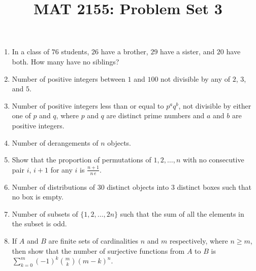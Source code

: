 \documentclass[svgnames]{amsart}
\title{MAT 2155: Problem Set 3}
\date{}
\begin{document}
\maketitle
\begin{enumerate}[leftmargin=*]
\item In a class of $76$ students, $26$ have a brother, $29$ have a sister, and $20$ have both. How many have no siblings?

\item Number of positive integers between $1$ and $100$ not divisible by any of $2$, $3$, and $5$.

\item Number of positive integers less than or equal to $p^a q^b$, not divisible by either one of $p$ and $q$, where $p$ and $q$ are distinct prime numbers and $a$ and $b$ are positive integers.

\item Number of derangements of $n$ objects.

\item Show that the proportion of permutations of $1, 2, \ldots, n$ with no consecutive pair $i$, $i + 1$ for any $i$ is $\frac{n + 1}{n\,e}$.

\item Number of distributions of $30$ distinct objects into $3$ distinct boxes such that no box is empty.

\item Number of subsets of $\{1, 2, \ldots, 2n\}$ such that the sum of all the elements in the subset is odd.

\item If $A$ and $B$ are finite sets of cardinalities $n$ and $m$ respectively, where $n \ge m$, then show that the number of surjective functions from $A$ to $B$ is $\sum\limits_{k=0}^m (-1)^k \binom m k (m - k)^n$.

\end{enumerate}
\end{document}
